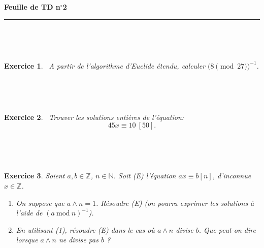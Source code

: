 \documentclass[11pt,a4paper]{article}
\title{}
\date{}
\newtheorem{ex}{Exercice}
\newcommand{\HRule}{\rule{\linewidth}{0.5mm}}
\newcommand{\N}{\mathbb{N}}
\newcommand{\Z}{\mathbb{Z}}
\begin{document}
\pagestyle{fancy}

\fancyhead{}
 \fancyfoot{}


\newcommand{\lb}{\llbracket}
\newcommand{\rb}{\rrbracket}


\newcommand{\md}[3]{#1\ \equiv \ #2 \! \! \! \! \! \pmod {#3} }
\newcommand{\nmd}[3]{#1 \not \equiv #2 \! \! \! \! \!  \pmod {#3} }
\newcommand{\mda}[3]{#1 \equiv #2 \! \!  \pmod {#3} }
\newcommand{\nmda}[3]{#1 \not \equiv #2 \! \! \pmod {#3} }
\newcommand{\mo}[2]{#1 \! \! \! \! \! \pmod #2 }
\newcommand{\moa}[2]{#1 \! \!  \pmod {#2} }


\thispagestyle{fancy}

\begin{center}
    { \huge \bfseries
    Feuille de TD n$^{\boldsymbol{\circ}}$2
     \\ [0cm] }
    \HRule \\[0.5cm]
\end{center}


\

\begin{ex}\label{inverse_modulaire}\
A partir de l'algorithme d'Euclide étendu, calculer $\big(\moa{8}{27}\big)^{-1}$.
\end{ex}


\

\

\begin{ex}\label{equation_lineaire_modulaire}\
Trouver les solutions entières de l'équation:
$$  {45x}\equiv {10}\  [{50}].    $$
\end{ex}



\

\



\begin{ex}\label{equation_lineaire_modulaire_generale}
Soient $a,b\in \Z$, $n\in \N$. Soit (E) l'équation $a x\equiv b[n]$, d'inconnue $x\in \Z$. \begin{enumerate}
\item On suppose que $a\wedge n=1$. Résoudre (E) (on pourra exprimer les solutions à l'aide de $(a \mathrm{\ mod\ }n)^{-1}$).

\item En utilisant (1), résoudre (E) dans le cas où $a\wedge n$  divise $b$. Que peut-on dire lorsque $a\wedge n$ ne divise pas $b$ ?
\end{enumerate}
\end{ex}
\end{document}
